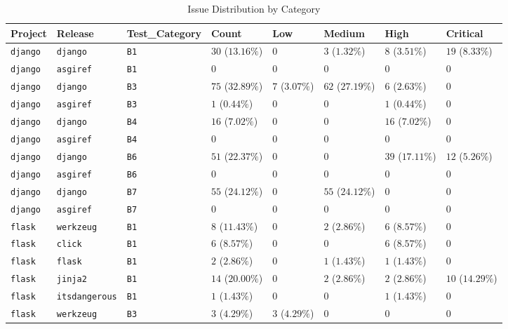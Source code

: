 \begin{table}
\caption{Issue Distribution by Category}
\label{tab:issue-category-distribution}
\begin{tabular}{llllllll}
\toprule
Project & Release & Test_Category & Count & Low & Medium & High & Critical \\
\midrule
\texttt{django} & \texttt{django} & \texttt{B1} & $30$ ($13.16\%$) & $0$ & $3$ ($1.32\%$) & $8$ ($3.51\%$) & $19$ ($8.33\%$) \\
\texttt{django} & \texttt{asgiref} & \texttt{B1} & $0$ & $0$ & $0$ & $0$ & $0$ \\
\texttt{django} & \texttt{django} & \texttt{B3} & $75$ ($32.89\%$) & $7$ ($3.07\%$) & $62$ ($27.19\%$) & $6$ ($2.63\%$) & $0$ \\
\texttt{django} & \texttt{asgiref} & \texttt{B3} & $1$ ($0.44\%$) & $0$ & $0$ & $1$ ($0.44\%$) & $0$ \\
\texttt{django} & \texttt{django} & \texttt{B4} & $16$ ($7.02\%$) & $0$ & $0$ & $16$ ($7.02\%$) & $0$ \\
\texttt{django} & \texttt{asgiref} & \texttt{B4} & $0$ & $0$ & $0$ & $0$ & $0$ \\
\texttt{django} & \texttt{django} & \texttt{B6} & $51$ ($22.37\%$) & $0$ & $0$ & $39$ ($17.11\%$) & $12$ ($5.26\%$) \\
\texttt{django} & \texttt{asgiref} & \texttt{B6} & $0$ & $0$ & $0$ & $0$ & $0$ \\
\texttt{django} & \texttt{django} & \texttt{B7} & $55$ ($24.12\%$) & $0$ & $55$ ($24.12\%$) & $0$ & $0$ \\
\texttt{django} & \texttt{asgiref} & \texttt{B7} & $0$ & $0$ & $0$ & $0$ & $0$ \\
\texttt{flask} & \texttt{werkzeug} & \texttt{B1} & $8$ ($11.43\%$) & $0$ & $2$ ($2.86\%$) & $6$ ($8.57\%$) & $0$ \\
\texttt{flask} & \texttt{click} & \texttt{B1} & $6$ ($8.57\%$) & $0$ & $0$ & $6$ ($8.57\%$) & $0$ \\
\texttt{flask} & \texttt{flask} & \texttt{B1} & $2$ ($2.86\%$) & $0$ & $1$ ($1.43\%$) & $1$ ($1.43\%$) & $0$ \\
\texttt{flask} & \texttt{jinja2} & \texttt{B1} & $14$ ($20.00\%$) & $0$ & $2$ ($2.86\%$) & $2$ ($2.86\%$) & $10$ ($14.29\%$) \\
\texttt{flask} & \texttt{itsdangerous} & \texttt{B1} & $1$ ($1.43\%$) & $0$ & $0$ & $1$ ($1.43\%$) & $0$ \\
\texttt{flask} & \texttt{werkzeug} & \texttt{B3} & $3$ ($4.29\%$) & $3$ ($4.29\%$) & $0$ & $0$ & $0$ \\

\end{tabular}
\end{table}
